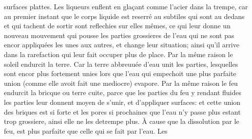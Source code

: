  surfaces plattes.
Les liqueurs\protect{}
%
enflent en gla\c{c}ant comme l’acier\protect{} dans la trempe\protect{}, car au premier instant que le corps liquide est reserr\'{e} au
 subtiles qui sont au dedans et qui tachent de sortir sont reflechies sur elles mêmes, ce qui leur donne un nouveau mouvement qui pousse les parties grossieres de l'eau\protect{} qui ne sont pas encor appliqu\'{e}es les unes aux autres, et change leur situation; ainsi qu'il arrive dans la rarefaction\protect{} qui leur fait occuper plus de place.%
%
\pend%
\pstart%
Par
%
la m\^{e}me raison le soleil\protect{} endurcit la terre\protect{}. Car la terre\protect{} abbreuu\'{e}e d'eau\protect{} unit les parties, lesquelles sont encor plus fortement unies lors que l'eau\protect{} qui empechoit une plus parfaite union (comme elle avoit fait une mediocre) evapore. Par la même raison le feu\protect{} endurcit la bricque ou terre\protect{} cuite, parce que les parties du feu\protect{} y
rendant fluides les parties leur donnent moyen de s'unir, et d'appliquer
surfaces: et cette union des briques est si forte et les pores si prochaines que l'eau\protect{} n'y passe plus estant trop grossiere, ainsi elle ne les detrempe\protect{} plus.
À cause que la dissolution par le feu\protect{}, est plus parfaite que celle qui se fait par l'eau\protect{}.%
%
\pend%
\pstart%
Les
%
